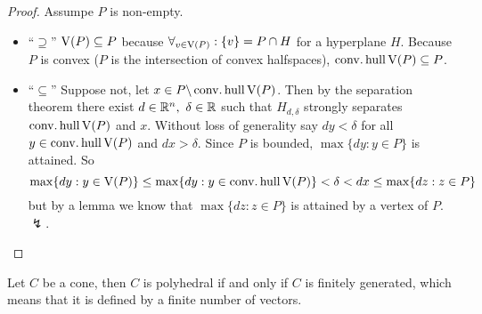 \documentclass{exam}
\begin{document}
    \begin{proof}
        Assumpe $P$ is non-empty.
        \begin{itemize}
            \item ``$\supseteq$'' $\operatorname{\mathrm{V}}(P) \subseteq P$ because $\forall_{v \in \operatorname{\mathrm{V}}(P)} : \{ v\} = P \cap H$ for a hyperplane $H$.
            Because $P$ is convex ($P$ is the intersection of convex halfspaces), $\operatorname{\mathop{conv.hull}} \operatorname{\mathrm{V}}(P) \subseteq P$.
            \item ``$\subseteq$'' Suppose not, let $x \in P \backslash \operatorname{\mathop{conv.hull}} \operatorname{\mathrm{V}}(P) $.
            Then by the separation theorem there exist $d \in \mathbb{R}^n,\ \delta \in \mathbb{R}$ such that $H_{d,\delta}$ strongly separates $\operatorname{\mathop{conv.hull}} \operatorname{\mathrm{V}}(P)$ and $x$.
            Without loss of generality say $d y < \delta $ for all $y \in \operatorname{\mathop{conv.hull}} \operatorname{\mathrm{V}} (P)$ and $dx > \delta$.
            Since $P$ is bounded, $\max \{ dy : y \in P \}$ is attained.
            So
            \[
                \max \{ d y : y \in \operatorname{\mathrm{V}} (P) \} \le \max \{ dy : y \in \operatorname{\mathop{conv.hull}} \operatorname{\mathrm{V}} (P) \} < \delta < dx \le \max \{ dz : z \in P \}
            \]
            but by a lemma we know that $\max \{ dz : z \in P \}$ is attained by a vertex of $P$. $\lightning$.
        \end{itemize}
    \end{proof}
    \begin{theorem}
        Let $C$ be a cone, then $C$ is polyhedral if and only if $C$ is finitely generated, which means that it is defined by a finite number of vectors.
    \end{theorem}
\end{document}
